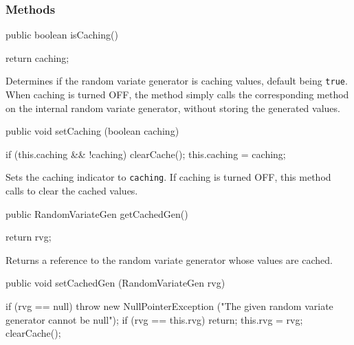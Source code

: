 \subsubsection* {Methods}
\begin{code}

   public boolean isCaching()\begin{hide} {
      return caching;
   }\end{hide}
\end{code}
\begin{tabb}   Determines if the random variate generator is caching values,
 default being \texttt{true}.
 When caching is turned OFF, the 
 method simply calls the corresponding method on the internal
 random variate generator, without storing the generated values.
\end{tabb}
\begin{htmlonly}
\end{htmlonly}
\begin{code}

   public void setCaching (boolean caching)\begin{hide} {
      if (this.caching && !caching)
         clearCache();
      this.caching = caching;
   }\end{hide}
\end{code}
\begin{tabb}   Sets the caching indicator to \texttt{caching}.
 If caching is turned OFF, this method calls 
 to clear the cached values.
\end{tabb}
\begin{htmlonly}
\end{htmlonly}
\begin{code}

   public RandomVariateGen getCachedGen()\begin{hide} {
      return rvg;
   }\end{hide}
\end{code}
\begin{tabb}   Returns a reference to the random variate generator
 whose values are cached.
\end{tabb}
\begin{htmlonly}
\end{htmlonly}
\begin{code}

   public void setCachedGen (RandomVariateGen rvg)\begin{hide} {
      if (rvg == null)
         throw new NullPointerException
            ("The given random variate generator cannot be null");
      if (rvg == this.rvg)
         return;
      this.rvg = rvg;
      clearCache();
   }\end{hide}
\end{code}
